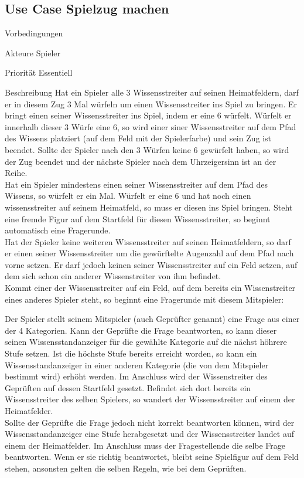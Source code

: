 \subsection{Use Case Spielzug machen}
\begin{labeling}[:]{Vorbedingungen}
\item [Akteure] Spieler
\item [Priorität] Essentiell
\item [Beschreibung] Hat ein Spieler alle 3 Wissensstreiter auf seinen Heimatfeldern, darf er in diesem Zug 3 Mal würfeln um einen Wissensstreiter ins Spiel zu bringen. Er bringt einen seiner Wissensstreiter ins Spiel, indem er eine 6 würfelt. Würfelt er innerhalb dieser 3 Würfe eine 6, so wird einer siner Wissensstreiter auf dem Pfad des Wissens platziert (auf dem Feld mit der Spielerfarbe) und sein Zug ist beendet. Sollte der Spieler nach den 3 Würfen keine 6 gewürfelt haben, so wird der Zug beendet und der nächste Spieler nach dem Uhrzeigersinn ist an der Reihe. \\
Hat ein Spieler mindestens einen seiner Wissensstreiter auf dem Pfad des Wissens, so würfelt er ein Mal. Würfelt er eine 6 und hat noch einen wissensstreiter auf seinem Heimatfeld, so muss er diesen ins Spiel bringen. Steht eine fremde Figur auf dem Startfeld für diesen Wissensstreiter, so beginnt automatisch eine Fragerunde. \\
Hat der Spieler keine weiteren Wissensstreiter auf seinen Heimatfeldern, so darf er einen seiner Wissensstreiter um die gewürftelte Augenzahl auf dem Pfad nach vorne setzen. Er darf jedoch keinen seiner Wissensstreiter auf ein Feld setzen, auf dem sich schon ein anderer Wissenstreiter von ihm befindet. \\
Kommt einer der Wissensstreiter auf ein Feld, auf dem bereits ein Wissenstreiter eines anderes Spieler steht, so beginnt eine Fragerunde mit diesem Mitspieler:

Der Spieler stellt seinem Mitspieler (auch Geprüfter genannt) eine Frage aus einer der 4 Kategorien. Kann der Geprüfte die Frage beantworten, so kann dieser seinen Wissensstandanzeiger für die gewählte Kategorie auf die nächst höhrere Stufe setzen. Ist die höchste Stufe bereits erreicht worden, so kann ein Wissensstandanzeiger in einer anderen Kategorie (die von dem Mitspieler bestimmt wird) erhöht werden. Im Anschluss wird der Wissenstreiter des Geprüften auf dessen Startfeld gesetzt. Befindet sich dort bereits ein Wissensstreiter des selben Spielers, so wandert der Wissensstreiter auf einem der Heimatfelder. \\
Sollte der Geprüfte die Frage jedoch nicht korrekt beantworten können, wird der Wissensstandanzeiger eine Stufe herabgesetzt und der Wissensstreiter landet auf einem der Heimatfelder. Im Anschluss muss der Fragestellende die selbe Frage beantworten. Wenn er sie richtig beantwortet, bleibt seine Spielfigur auf dem Feld stehen, ansonsten gelten die selben Regeln, wie bei dem Geprüften. \\


\end{labeling}
